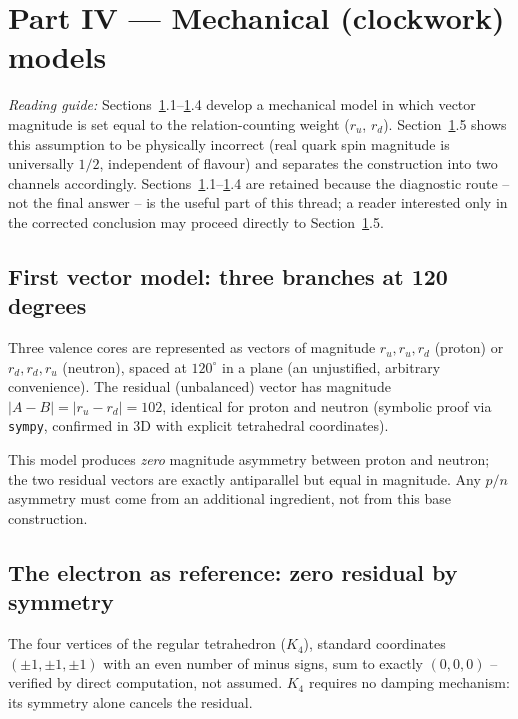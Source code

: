 \documentclass[11pt]{article}
\def\texorpdfstring#1#2{#2}%
\begin{document}
\section{Part IV --- Mechanical (clockwork) models}
\label{sec:mechanical}

\textit{Reading guide:} Sections~\ref{sec:mechanical}.1--\ref{sec:mechanical}.4 develop a mechanical model in which vector magnitude is set equal to the relation-counting weight ($r_u$, $r_d$). Section~\ref{sec:mechanical}.5 shows this assumption to be physically incorrect (real quark spin magnitude is universally $1/2$, independent of flavour) and separates the construction into two channels accordingly. Sections~\ref{sec:mechanical}.1--\ref{sec:mechanical}.4 are retained because the diagnostic route -- not the final answer -- is the useful part of this thread; a reader interested only in the corrected conclusion may proceed directly to Section~\ref{sec:mechanical}.5.


\subsection{First vector model: three branches at \texorpdfstring{$120^\circ$}{120 degrees}}
Three valence cores are represented as vectors of magnitude $r_u,r_u,r_d$ (proton) or $r_d,r_d,r_u$ (neutron), spaced at $120^\circ$ in a plane (an unjustified, arbitrary convenience). The residual (unbalanced) vector has magnitude $|A-B|=|r_u-r_d|=102$, identical for proton and neutron (symbolic proof via \texttt{sympy}, confirmed in 3D with explicit tetrahedral coordinates).

\begin{negativebox}
This model produces \emph{zero} magnitude asymmetry between proton and neutron; the two residual vectors are exactly antiparallel but equal in magnitude. Any $p/n$ asymmetry must come from an additional ingredient, not from this base construction.
\end{negativebox}

\subsection{The electron as reference: zero residual by symmetry}
The four vertices of the regular tetrahedron ($K_4$), standard coordinates $(\pm1,\pm1,\pm1)$ with an even number of minus signs, sum to exactly $(0,0,0)$ -- verified by direct computation, not assumed. $K_4$ requires no damping mechanism: its symmetry alone cancels the residual.
\end{document}
